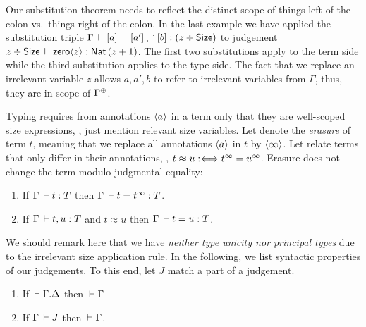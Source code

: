 \documentclass[acmsmall%
]{acmart}\settopmatter{printfolios=true}
\begin{document}
Our substitution theorem
needs to reflect the distinct scope of things left of the colon vs.\
things right of the colon.  In the last example we have applied the
substitution triple $\Gamma \,\vdash [a] = [a'] \risingdotseq [b] : (z \div \mathsf{Size})$
to judgement $z \div \mathsf{Size} \,\vdash \mathsf{zero}\langle z\rangle : \mathsf{Nat}\, (z + 1)$.
The first two substitutions apply to the term side while the third
substitution applies to the type side.  The fact that we replace an
irrelevant variable $z$ allows $a,a',b$ to refer to irrelevant
variables from $\Gamma$, thus, they are in scope of $\resurrect\Gamma$.

Typing requires from annotations $\langle a\rangle$ in a term only that they are well-scoped size expressions, \ie, just mention relevant size variables.  Let  denote the \emph{erasure} of term $t$, meaning that we replace all annotations $\langle a\rangle$ in $t$ by $\langle\infty\rangle$.  Let  relate terms that only differ in their annotations, \ie, $t \approx u \mathrel{:\Longleftrightarrow} t^\infty = u^\infty$.
Erasure does not change the term modulo judgmental equality:
\begin{lemma}
\label{lem:erase}
\bla
\begin{enumerate}
\item If\/ $\Gamma \,\vdash t : T$ then $\Gamma \,\vdash t = t^\infty : T$.
\item If\/ $\Gamma \,\vdash t, u : T$ and $t \approx u$ then $\Gamma \,\vdash t = u : T$.
\end{enumerate}
\end{lemma}



\noindent
We should remark here that we have \emph{neither type unicity nor principal types}
due to the irrelevant size application rule.
In the following, we list syntactic properties of our judgements.  To
this end, let $J$ %
match a part of a judgement.

\begin{lemma}
\label{lem:cxtwf}\bla
  \begin{enumerate}
  \item If\/ $\,\vdash \Gamma. \Delta$ then $\,\vdash \Gamma$
  \item If\/ $\Gamma \,\vdash J$ then $\,\vdash \Gamma$.
  \end{enumerate}
\end{lemma}
\end{document}
